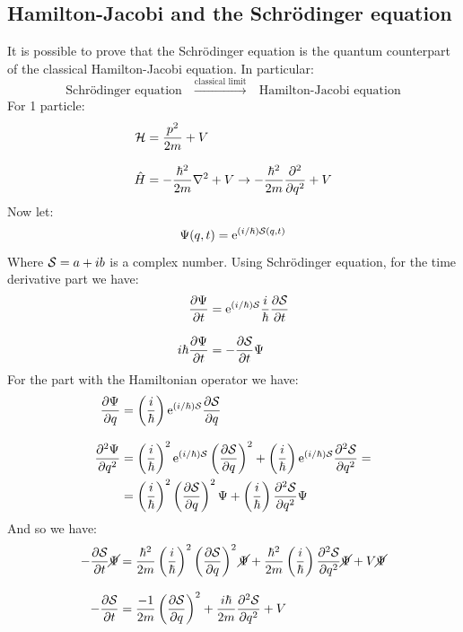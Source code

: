 \subsection{Hamilton-Jacobi and the Schrödinger equation}
It is possible to prove that the Schrödinger equation is the quantum counterpart of the classical Hamilton-Jacobi equation. In particular:
\begin{equation}
  \text{Schrödinger equation} \quad \xrightarrow{\text{classical limit}} \quad \text{Hamilton-Jacobi equation}
\end{equation}
For 1 particle:
\begin{equation}
  \begin{split}
    \hamfun &= \dfrac{p^2}{2m} + V\\[8pt]
    \hat{H} &= -\dfrac{\hbar^2}{2m} \lap + V \rightarrow -\dfrac{\hbar^2}{2m} \pdv[2]{}{q} + V
  \end{split}
\end{equation}
Now let:
\begin{equation}
  \Psi(q,t) = \mathrm{e}^{(i/ \hbar) \mathcal{S}(q,t)}
\end{equation}
Where $\mathcal{S} = a + ib$ is a complex number. Using Schrödinger equation, for the time derivative part we have:
\begin{equation}
  \begin{split}
    \pdv{\Psi}{t} &= \efunction^{(i/ \hbar) \action} \dfrac{i}{\hbar}\pdv{\action}{t}\\[8pt]
    i\hbar\pdv{\Psi}{t} &= -\pdv{\action}{t} \Psi
  \end{split}
\end{equation}
For the part with the Hamiltonian operator we have:
\begin{equation}
  \begin{split}
    \pdv{\Psi}{q} &= \brackets{\dfrac{i}{\hbar}}\efunction^{(i/ \hbar) \action} \pdv{\action}{q}\\[8pt]
    \pdv[2]{\Psi}{q} &= \brackets{\dfrac{i}{\hbar}}^2\efunction^{(i/ \hbar) \action}\brackets{\pdv{\action}{q}}^2 + \brackets{\dfrac{i}{\hbar}}\efunction^{(i/ \hbar) \action} \pdv[2]{\action}{q}=\\
    &= \brackets{\dfrac{i}{\hbar}}^2\brackets{\pdv{\action}{q}}^2 \Psi + \brackets{\dfrac{i}{\hbar}}\pdv[2]{\action}{q} \Psi
  \end{split}
\end{equation}
And so we have:
\begin{equation}
  \begin{split}
    -\pdv{\action}{t} \cancel{\Psi} &= \dfrac{\hbar^2}{2m}\brackets{\dfrac{i}{\hbar}}^2\brackets{\pdv{\action}{q}}^2 \cancel{\Psi} + \dfrac{\hbar^2}{2m}\brackets{\dfrac{i}{\hbar}}\pdv[2]{\action}{q} \cancel{\Psi} + V\cancel{\Psi}\\[8pt]
    -\pdv{\action}{t} &= \dfrac{-1}{2m}\brackets{\pdv{\action}{q}}^2  + \dfrac{i\hbar}{2m}\pdv[2]{\action}{q} + V
  \end{split}
\end{equation}
